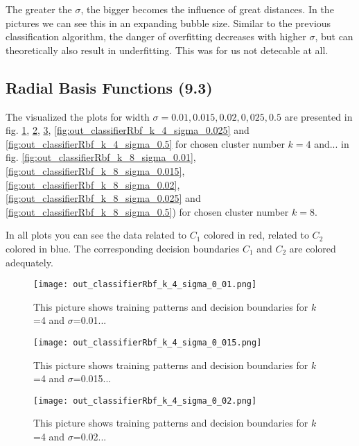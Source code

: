 \documentclass[a4paper,headings=small]{scrartcl}
\begin{document}
The greater the $\sigma$, the bigger becomes the influence of great distances.
In the pictures we can see this in an expanding bubble size.
Similar to the previous classification algorithm, the danger of overfitting decreases with higher $\sigma$,
but can theoretically also result in underfitting.
This was for us not detecable at all.


\subsection{Radial Basis Functions (9.3)}
The visualized the plots for width $\sigma = 0.01, 0.015, 0.02, 0,025, 0.5$ are presented in fig.
\ref{fig:out_classifierRbf_k_4_sigma_0.01},
\ref{fig:out_classifierRbf_k_4_sigma_0.015},
\ref{fig:out_classifierRbf_k_4_sigma_0.02},
\ref{fig:out_classifierRbf_k_4_sigma_0.025} and
\ref{fig:out_classifierRbf_k_4_sigma_0.5}
for chosen cluster number $k = 4$ and... in fig.
\ref{fig:out_classifierRbf_k_8_sigma_0.01},
\ref{fig:out_classifierRbf_k_8_sigma_0.015},
\ref{fig:out_classifierRbf_k_8_sigma_0.02},
\ref{fig:out_classifierRbf_k_8_sigma_0.025} and
\ref{fig:out_classifierRbf_k_8_sigma_0.5})
for chosen cluster number $k = 8$.

In all plots you can see the data related to $C_1$ colored in red, related to $C_2$ colored in blue.
The corresponding decision boundaries $C_1$ and $C_2$ are colored adequately.

\begin{figure}[htbp]
\centering
\texttt{[image: out\_classifierRbf\_k\_4\_sigma\_0\_01.png]}
\caption{This picture shows training patterns and decision boundaries for $k$=4 and $\sigma$=0.01...}
\label{fig:out_classifierRbf_k_4_sigma_0.01}
\end{figure}

\begin{figure}[htbp]
\centering
\texttt{[image: out\_classifierRbf\_k\_4\_sigma\_0\_015.png]}
\caption{This picture shows training patterns and decision boundaries for $k$=4 and $\sigma$=0.015...}
\label{fig:out_classifierRbf_k_4_sigma_0.015}
\end{figure}

\begin{figure}[htbp]
\centering
\texttt{[image: out\_classifierRbf\_k\_4\_sigma\_0\_02.png]}
\caption{This picture shows training patterns and decision boundaries for $k$=4 and $\sigma$=0.02...}
\label{fig:out_classifierRbf_k_4_sigma_0.02}
\end{figure}
\end{document}
